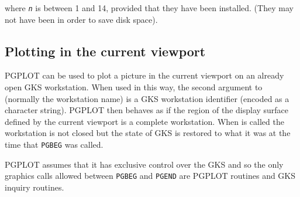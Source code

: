\documentclass[twoside,11pt,nolof]{starlink}
\begin{document}
where \texttt{\emph{n}} is between 1 and 14, provided that they have
been installed.  (They may not have been in order to save disk space).

\subsection{ %
Plotting in the current viewport}
\label{plotting_in_the_current_viewport}
\label{viewport}

PGPLOT can be used to plot a picture in the current viewport on an
already open GKS workstation. When used in this way, the second
argument to  (normally the workstation
name) is a GKS workstation identifier (encoded as a character string).
PGPLOT then behaves as if the region of the display surface defined by
the current viewport is a complete workstation.  When
 is called the workstation is not closed
but the state of GKS is restored to what it was at the time that
\texttt{PGBEG} was called.

PGPLOT assumes that it has exclusive control over the GKS and so the only
graphics calls allowed between \texttt{PGBEG} and \texttt{PGEND} are PGPLOT
routines and GKS inquiry routines.
\end{document}
